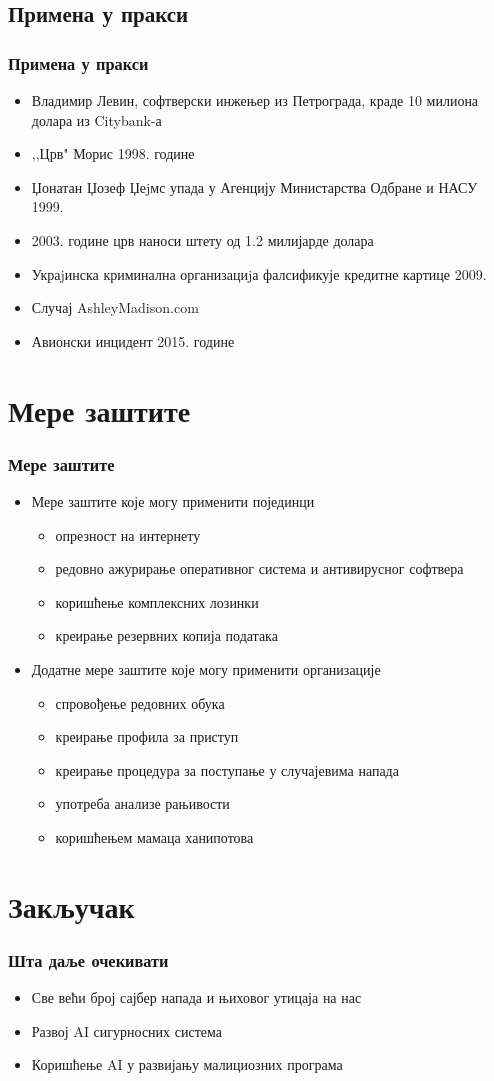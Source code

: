 \documentclass{beamer}
\begin{document}
\subsection{Примена у пракси}

\begin{frame}[fragile]\frametitle{Примена у пракси}
	\begin{itemize}
		\item Владимир Левин, софтверски инжењер из Петрограда, краде 10 милиона долара из Citybank-а
		\item ,,Црв" Морис 1998. године
		\item Џонатан Џозеф Џеjмс упада у Агенцију Министарства Одбране и НАСУ 1999.
		\item 2003. године црв наноси штету од 1.2 милијарде долара
		\item Украjинска криминална организациjа фалсификује кредитне картице 2009.
		\item Случај AshleyMadison.com 
		\item Авионски инцидент 2015. године
	\end{itemize}
\end{frame}

\section{Мере заштите}

\begin{frame}[fragile]\frametitle{Мере заштите}
	\begin{itemize}	
	\item Мере заштите које могу применити појединци
		\begin{itemize}
		\item опрезност на интернету
		\item редовно ажурирање оперативног система и антивирусног софтвера
		\item коришћење комплексних лозинки
		\item креирање резервних копија података
	\end{itemize}
	\item Додатне мере заштите које могу применити организације
	\begin{itemize}
		\item спровођење редовних обука 
		\item креирање профила за приступ
		\item креирање процедура за поступање у случајевима напада
		\item употреба анализе рањивости
		\item коришћењем мамаца ханипотова
	\end{itemize}
	\end{itemize}
\end{frame}
\section{Закључак}
	\begin{frame}\frametitle{Шта даље очекивати}
		\begin{itemize}
			\item Све већи број сајбер напада и њиховог утицаја на нас
			\item Развој AI сигурносних система
			\item Коришћење AI у развијању малициозних програма
		\end{itemize}
	\end{frame}
\end{document}
